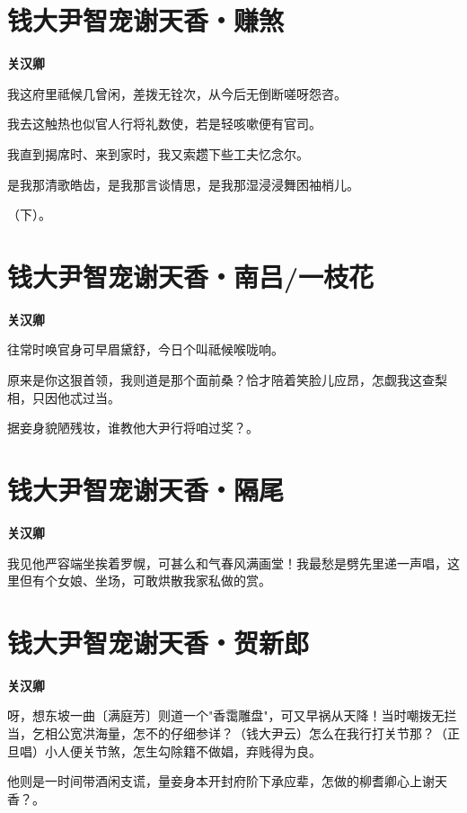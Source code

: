 \documentclass[12pt,a4paper]{ctexbook}
\begin{document}
\section{钱大尹智宠谢天香・赚煞}
\textbf{关汉卿}\par\vspace{0.5em}
我这府里祗候几曾闲，差拨无铨次，从今后无倒断嗟呀怨咨。\par
我去这触热也似官人行将礼数使，若是轻咳嗽便有官司。\par
我直到揭席时、来到家时，我又索趱下些工夫忆念尔。\par
是我那清歌皓齿，是我那言谈情思，是我那湿浸浸舞困袖梢儿。\par
（下）。\par

\section{钱大尹智宠谢天香・南吕/一枝花}
\textbf{关汉卿}\par\vspace{0.5em}
往常时唤官身可早眉黛舒，今日个叫祗候喉咙响。\par
原来是你这狠首领，我则道是那个面前桑？恰才陪着笑脸儿应昂，怎觑我这查梨相，只因他忒过当。\par
据妾身貌陋残妆，谁教他大尹行将咱过奖？。\par

\section{钱大尹智宠谢天香・隔尾}
\textbf{关汉卿}\par\vspace{0.5em}
我见他严容端坐挨着罗幌，可甚么和气春风满画堂！我最愁是劈先里递一声唱，这里但有个女娘、坐场，可敢烘散我家私做的赏。\par

\section{钱大尹智宠谢天香・贺新郎}
\textbf{关汉卿}\par\vspace{0.5em}
呀，想东坡一曲〔满庭芳〕则道一个"香霭雕盘"，可又早祸从天降！当时嘲拨无拦当，乞相公宽洪海量，怎不的仔细参详？（钱大尹云）怎么在我行打关节那？（正旦唱）小人便关节煞，怎生勾除籍不做娼，弃贱得为良。\par
他则是一时间带酒闲支谎，量妾身本开封府阶下承应辈，怎做的柳耆卿心上谢天香？。\par
\end{document}

